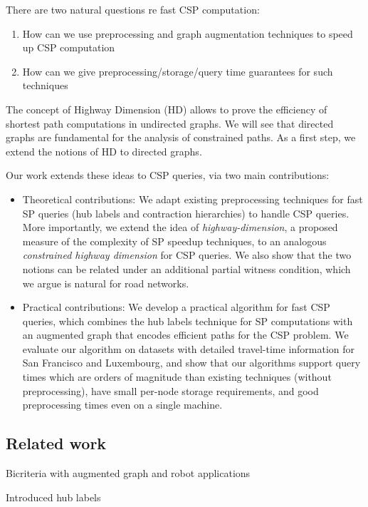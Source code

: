 \noindent There are two natural questions re fast CSP computation:
\begin{enumerate}[nosep,leftmargin=*]
\item How can we use preprocessing and graph augmentation techniques to speed up CSP computation 
\item How can we give preprocessing/storage/query time guarantees for such techniques
\end{enumerate}
The concept of Highway Dimension (HD) \cite{highway2010,highway2013} allows to prove the efficiency of shortest path computations in undirected graphs.
We will see that directed graphs are fundamental for the analysis of constrained paths.
As a first step, we extend the notions of HD to directed graphs.

Our work extends these ideas to CSP queries, via two main contributions: 
\begin{itemize}[nosep,leftmargin=*]
	\item Theoretical contributions: We adapt existing preprocessing techniques for fast SP queries (hub labels and contraction hierarchies) to handle CSP queries. More importantly, we extend the idea of \emph{highway-dimension}, a proposed measure of the complexity of SP speedup techniques, to an analogous \emph{constrained highway dimension} for CSP queries.
	We also show that the two notions can be related under an additional partial witness condition, which we argue is natural for road networks.
	\item Practical contributions: We develop a practical algorithm for fast CSP queries, which combines the hub labels technique for SP computations with an augmented graph that encodes efficient paths for the CSP problem. We evaluate our algorithm on datasets with detailed travel-time information for San Francisco and Luxembourg, and show that our algorithms support query times which are orders of magnitude than existing techniques (without preprocessing), have small per-node storage requirements, and good preprocessing times even on a single machine. 
\end{itemize}	


\subsection{Related work}

Bicriteria with augmented graph and robot applications \cite{alex_bicriteria}

Introduced hub labels\cite{cohen_definition_hl}

